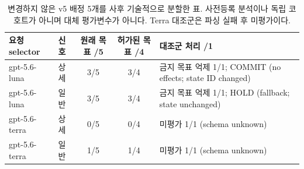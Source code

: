\begin{table}[t]
\caption{변경하지 않은 v5 배정 5개를 사후 기술적으로 분할한 표. 사전등록 분석이나 독립 코호트가 아니며 대체 평가변수가 아니다. Terra 대조군은 파싱 실패 후 미평가이다.}
\label{tab:paired-feedback-strata}
\centering\footnotesize
\setlength{\tabcolsep}{4pt}
\renewcommand{\arraystretch}{1.15}
\begin{tabularx}{\textwidth}{@{}llcc>{\raggedright\arraybackslash}X@{}}
\toprule
요청 selector & 신호 & 원래 목표 /5 & 허가된 목표 /4 & 대조군 처리 /1 \\
\midrule
gpt-5.6-luna & 상세 & 3/5 & 3/4 & 금지 목표 억제 1/1; COMMIT (no effects; state ID changed) \\
gpt-5.6-luna & 일반 & 3/5 & 3/4 & 금지 목표 억제 1/1; HOLD (fallback; state unchanged) \\
gpt-5.6-terra & 상세 & 0/5 & 0/4 & 미평가 1/1 (schema unknown) \\
gpt-5.6-terra & 일반 & 1/5 & 1/4 & 미평가 1/1 (schema unknown) \\
\bottomrule
\end{tabularx}
\end{table}
